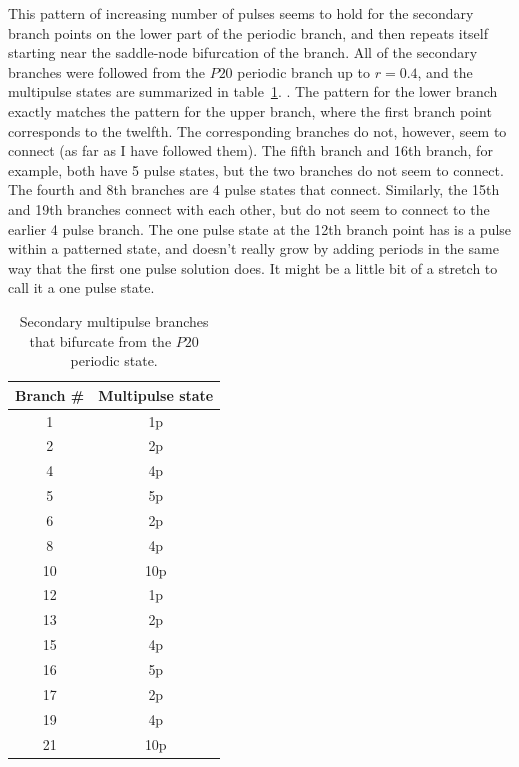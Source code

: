 \documentclass[api,pof,pre,12pt,a4paper]{revtex4-1}
\begin{document}
This pattern of increasing number of pulses seems to hold for the secondary branch points on the lower part of the periodic branch, and then repeats itself starting near the saddle-node bifurcation of the branch. All of the secondary branches were followed from the $P20$ periodic branch up to $r=0.4$, and the multipulse states are summarized in table~\ref{table:P20}. . The pattern for the lower branch exactly matches the pattern for the upper branch, where the first branch point corresponds to the twelfth. The corresponding branches do not, however, seem to connect (as far as I have followed them).  The fifth branch and 16th branch, for example, both have 5 pulse states, but the two branches do not seem to connect.  The fourth and 8th branches are 4 pulse states that connect.  Similarly, the 15th and 19th branches connect with each other, but do not seem to connect to the earlier 4 pulse branch. The one pulse state at the 12th branch point has is a pulse within a patterned state, and doesn't really grow by adding periods in the same way that the first one pulse solution does.  It might be a little bit of a stretch to call it a one pulse state.

\begin{table}[ht]
\caption{Secondary multipulse branches that bifurcate from the $P20$ periodic state.} %
\centering %
\begin{tabular}{c | c } %
\hline\hline %
 Branch \# &  Multipulse state \\
\hline  %

\hline %
1 & 1p \\
2& 2p\\
4 & 4p\\
5 & 5p\\
6 & 2p\\
8 & 4p\\
10 &10p\\
\hline%
12 & 1p\\
13 & 2p\\
15 & 4p\\
16 & 5p\\
17 & 2p\\
19 & 4p\\
21 & 10p\\
[1ex] %
\hline %
\end{tabular}
\label{table:P20} %
\end{table} 
\end{document}
